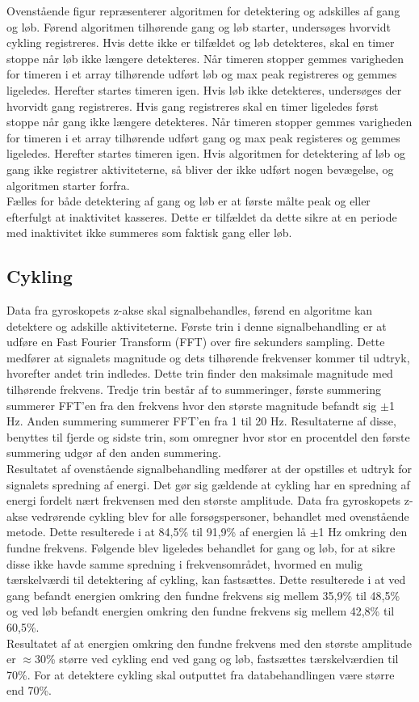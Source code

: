 Ovenstående figur repræsenterer algoritmen for detektering og adskilles af gang og løb. Førend algoritmen tilhørende gang og løb starter, undersøges hvorvidt cykling registreres. Hvis dette ikke er tilfældet og løb detekteres, skal en timer stoppe når løb ikke længere detekteres. Når timeren stopper gemmes varigheden for timeren i et array tilhørende udført løb og max peak registreres og gemmes ligeledes. Herefter startes timeren igen. Hvis løb ikke detekteres, undersøges der hvorvidt gang registreres. Hvis gang registreres skal en timer ligeledes først stoppe når gang ikke længere detekteres. Når timeren stopper gemmes varigheden for timeren i et array tilhørende udført gang og max peak registeres og gemmes ligeledes. Herefter startes timeren igen. Hvis algoritmen for detektering af løb og gang ikke registrer aktiviteterne, så bliver der ikke udført nogen bevægelse, og algoritmen starter forfra. \\
Fælles for både detektering af gang og løb er at første målte peak og eller efterfulgt at inaktivitet kasseres. Dette er tilfældet da dette sikre at en periode med inaktivitet ikke summeres som faktisk gang eller løb. 

\subsection{Cykling}
Data fra gyroskopets z-akse skal signalbehandles, førend en algoritme kan detektere og adskille aktiviteterne. Første trin i denne signalbehandling er at udføre en Fast Fourier Transform (FFT) over fire sekunders sampling. Dette medfører at signalets magnitude og dets tilhørende frekvenser kommer til udtryk, hvorefter andet trin indledes. Dette trin finder den maksimale magnitude med tilhørende frekvens. Tredje trin består af to summeringer, første summering summerer FFT'en fra den frekvens hvor den største magnitude befandt sig $\pm$1 Hz. Anden summering summerer FFT'en fra 1 til 20 Hz. Resultaterne af disse, benyttes til fjerde og sidste trin, som omregner hvor stor en procentdel den første summering udgør af den anden summering. \\
Resultatet af ovenstående signalbehandling medfører at der opstilles et udtryk for signalets spredning af energi. Det gør sig gældende at cykling har en spredning af energi fordelt nært frekvensen med den største amplitude. Data fra gyroskopets z-akse vedrørende cykling blev for alle forsøgspersoner, behandlet med ovenstående metode. Dette resulterede i at 84,5\% til 91,9\% af energien lå $\pm$1 Hz omkring den fundne frekvens. Følgende blev ligeledes behandlet for gang og løb, for at sikre disse ikke havde samme spredning i frekvensområdet, hvormed en mulig tærskelværdi til detektering af cykling, kan fastsættes.  Dette resulterede i at ved gang befandt energien omkring den fundne frekvens sig mellem 35,9\% til 48,5\% og ved løb befandt energien omkring den fundne frekvens sig mellem 42,8\% til 60,5\%. \\
Resultatet af at energien omkring den fundne frekvens med den største amplitude er $\approx$30\% større ved cykling end ved gang og løb, fastsættes tærskelværdien til 70\%. For at detektere cykling skal outputtet fra databehandlingen være større end 70\%.

